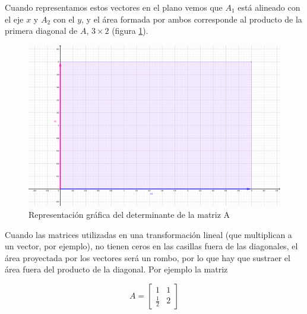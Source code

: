\documentclass[
]{book}
\begin{document}
Cuando representamos estos vectores en el plano vemos que \(A_1\) está alineado con el eje \(x\) y \(A_2\) con el \(y\), y el área formada por ambos corresponde al producto de la primera diagonal de \(A\), \(3 \times 2\) (figura \ref{fig:det}).

\begin{figure}

{\centering \includegraphics[width=41.67in]{Unidad-V/Determinante} 

}

\caption{Representación gráfica del determinante de la matriz A}\label{fig:det}
\end{figure}

Cuando las matrices utilizadas en una transformación lineal (que multiplican a un vector, por ejemplo), no tienen ceros en las casillas fuera de las diagonales, el área proyectada por los vectores será un rombo, por lo que hay que sustraer el área fuera del producto de la diagonal. Por ejemplo la matriz

\[
A = \left[ 
\begin{array}{cc}
1 & 1 \\
\frac{1}{2} & 2
\end{array}
\right]
\]
\end{document}
